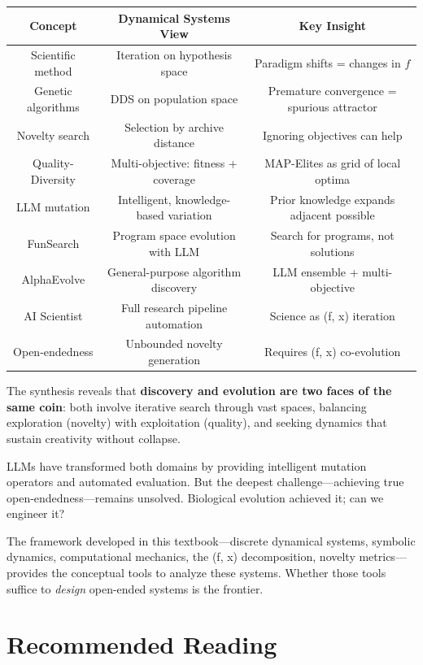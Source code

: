 \begin{center}
\begin{tabular}{ccc}
\toprule
Concept & Dynamical Systems View & Key Insight \\
\midrule
Scientific method & Iteration on hypothesis space & Paradigm shifts = changes in $f$ \\
Genetic algorithms & DDS on population space & Premature convergence = spurious attractor \\
Novelty search & Selection by archive distance & Ignoring objectives can help \\
Quality-Diversity & Multi-objective: fitness + coverage & MAP-Elites as grid of local optima \\
LLM mutation & Intelligent, knowledge-based variation & Prior knowledge expands adjacent possible \\
FunSearch & Program space evolution with LLM & Search for programs, not solutions \\
AlphaEvolve & General-purpose algorithm discovery & LLM ensemble + multi-objective \\
AI Scientist & Full research pipeline automation & Science as (f, x) iteration \\
Open-endedness & Unbounded novelty generation & Requires (f, x) co-evolution \\
\bottomrule
\end{tabular}
\end{center}

The synthesis reveals that \textbf{discovery and evolution are two faces of the same coin}: both involve iterative search through vast spaces, balancing exploration (novelty) with exploitation (quality), and seeking dynamics that sustain creativity without collapse.

LLMs have transformed both domains by providing intelligent mutation operators and automated evaluation. But the deepest challenge---achieving true open-endedness---remains unsolved. Biological evolution achieved it; can we engineer it?

The framework developed in this textbook---discrete dynamical systems, symbolic dynamics, computational mechanics, the (f, x) decomposition, novelty metrics---provides the conceptual tools to analyze these systems. Whether those tools suffice to \textit{design} open-ended systems is the frontier.



\section{Recommended Reading}

